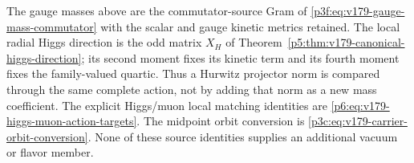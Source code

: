 \documentclass[12pt,a4paper]{article}
\begin{document}
\begin{remark}
\label{p7:rem:v179-hurwitz-action-comparison}
The gauge masses above are the commutator-source Gram of
\eqref{p3f:eq:v179-gauge-mass-commutator} with the scalar and gauge
kinetic metrics retained.  The local radial Higgs direction is the odd
matrix \(X_H\) of Theorem~\ref{p5:thm:v179-canonical-higgs-direction};
its second moment fixes its kinetic term and its fourth moment fixes
the family-valued quartic.  Thus a Hurwitz projector norm is compared
through the same complete action, not by adding that norm as a new
mass coefficient.  The explicit Higgs/muon local matching identities
are \eqref{p6:eq:v179-higgs-muon-action-targets}.
The midpoint orbit conversion is
\eqref{p3c:eq:v179-carrier-orbit-conversion}.  None of these source
identities supplies an additional vacuum or flavor member.
\end{remark}
\end{document}
